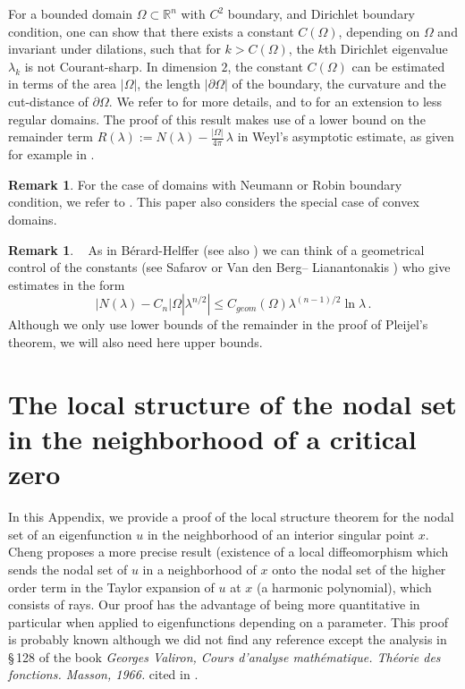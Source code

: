 \documentclass[12pt,a4paper]{amsart}
\theoremstyle{plain} %
\theoremstyle{definition}
\newtheorem{remark}[theorem]{Remark}
\numberwithin{equation}{section}
\numberwithin{figure}{section}
\numberwithin{table}{section}
\newcommand{\R}{\mathbb{R}}
\begin{document}
For a bounded domain $\Omega \subset \R^n$ with $C^2$ boundary, and Dirichlet boundary condition, one can show that there exists a constant $C(\Omega)$, depending on $\Omega$ and invariant under dilations, such that for $k > C(\Omega)$, the $k$th Dirichlet eigenvalue $\lambda_k$ is not Courant-sharp. In dimension $2$, the constant $C(\Omega)$ can be estimated in terms of the area $|\Omega|$, the length $|\partial \Omega|$ of the boundary, the curvature and the cut-distance of $\partial \Omega$. We refer to \cite[Theorem~1.3]{BeHe2016} for more details, and to \cite[Theorem~1]{BeGi2016} for an extension to less regular domains. The proof of this result makes use of a lower bound on the remainder term $R(\lambda) := N(\lambda) - \frac{|\Omega|}{4\pi} \, \lambda$ in Weyl's asymptotic estimate, as given for example in \cite{BeLi2001}.

\begin{remark}\label{R-mcs-4}
For the case of domains with Neumann or Robin boundary condition, we refer to \cite[Proposition~1.1]{GiLe2020}. This paper also considers the special case of convex domains.
\end{remark}%


\begin{remark}\label{R-mcs-6}~ As in B\'erard-Helffer \cite{BeHe2016}  (see also \cite{BeGi2016}) we can think of a geometrical control of the constants (see  Safarov  \cite{Safa2001} or  Van den Berg-- Lianantonakis \cite{BeLi2001})
 who give estimates in the form
 $$
|N(\lambda) - C_n |\Omega| \lambda^{n/2}| \leq C_{geom} (\Omega) \lambda^{(n-1)/2} \ln \lambda\,.
$$
Although we only use lower bounds of the remainder  in the proof of Pleijel's theorem, we will also need here upper bounds.
\end{remark}


\section{The local structure of the nodal set in the neighborhood of a critical zero}\label{S-lsns}

In this Appendix, we provide a proof of the local structure theorem for the nodal set of an eigenfunction $u$ in the neighborhood of an interior singular point $x$. Cheng \cite{Chen1976} proposes a more precise result (existence of a local diffeomorphism which sends the nodal set of $u$ in a neighborhood of $x$ onto the nodal set of the higher order term in the Taylor expansion of $u$ at $x$ (a harmonic polynomial), which consists of rays. Our proof has the advantage of being more quantitative in particular when applied to eigenfunctions depending on a parameter. This proof is probably known although we did not find any reference except the analysis in \S\,128 of the book \emph{Georges Valiron, Cours d'analyse math\'{e}matique. Th\'{e}orie des fonctions. Masson, 1966.} cited in \cite{Bess1980}.
\end{document}
